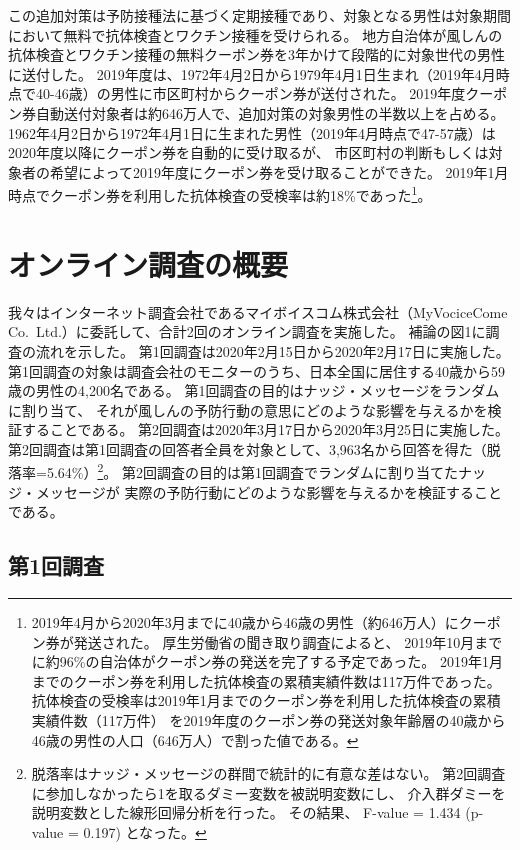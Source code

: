 \documentclass[
  11pt,
  a4paper,
]{article}
\begin{document}
この追加対策は予防接種法に基づく定期接種であり、対象となる男性は対象期間において無料で抗体検査とワクチン接種を受けられる。
地方自治体が風しんの抗体検査とワクチン接種の無料クーポン券を3年かけて段階的に対象世代の男性に送付した。
2019年度は、1972年4月2日から1979年4月1日生まれ（2019年4月時点で40-46歳）の男性に市区町村からクーポン券が送付された。
2019年度クーポン券自動送付対象者は約646万人で、追加対策の対象男性の半数以上を占める。
1962年4月2日から1972年4月1日に生まれた男性（2019年4月時点で47-57歳）は2020年度以降にクーポン券を自動的に受け取るが、
市区町村の判断もしくは対象者の希望によって2019年度にクーポン券を受け取ることができた。
2019年1月時点でクーポン券を利用した抗体検査の受検率は約18\%であった\footnote{2019年4月から2020年3月までに40歳から46歳の男性（約646万人）にクーポン券が発送された。
  厚生労働省の聞き取り調査によると、
  2019年10月までに約96\%の自治体がクーポン券の発送を完了する予定であった。
  2019年1月までのクーポン券を利用した抗体検査の累積実績件数は117万件であった。
  抗体検査の受検率は2019年1月までのクーポン券を利用した抗体検査の累積実績件数（117万件）
  を2019年度のクーポン券の発送対象年齢層の40歳から46歳の男性の人口（646万人）で割った値である。
}。

\hypertarget{experiment}{%
\section{オンライン調査の概要}\label{experiment}}

我々はインターネット調査会社であるマイボイスコム株式会社（MyVociceCome Co.~Ltd.）に委託して、合計2回のオンライン調査を実施した。
補論の図1に調査の流れを示した。
第1回調査は2020年2月15日から2020年2月17日に実施した。
第1回調査の対象は調査会社のモニターのうち、日本全国に居住する40歳から59歳の男性の4,200名である。
第1回調査の目的はナッジ・メッセージをランダムに割り当て、
それが風しんの予防行動の意思にどのような影響を与えるかを検証することである。
第2回調査は2020年3月17日から2020年3月25日に実施した。
第2回調査は第1回調査の回答者全員を対象として、3,963名から回答を得た（脱落率=5.64\%）\footnote{脱落率はナッジ・メッセージの群間で統計的に有意な差はない。
  第2回調査に参加しなかったら1を取るダミー変数を被説明変数にし、
  介入群ダミーを説明変数とした線形回帰分析を行った。
  その結果、
  F-value = 1.434 (p-value = 0.197)
  となった。}。
第2回調査の目的は第1回調査でランダムに割り当てたナッジ・メッセージが
実際の予防行動にどのような影響を与えるかを検証することである。

\hypertarget{wave1}{%
\subsection{第1回調査}\label{wave1}}
\end{document}
